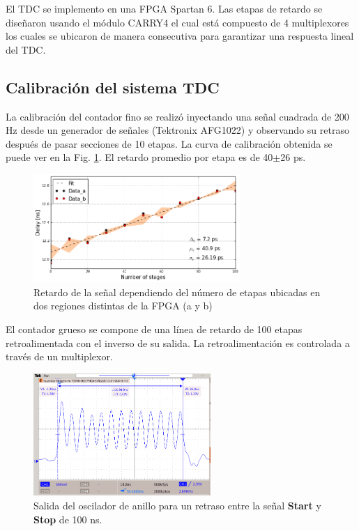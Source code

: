 El TDC se implemento en una FPGA Spartan 6. Las etapas de retardo se diseñaron usando el módulo CARRY4 el cual está compuesto de 4 multiplexores los cuales se ubicaron de manera consecutiva para garantizar una respuesta lineal del TDC.\\

\subsection{Calibración del sistema  TDC}

La calibración del contador fino se realizó inyectando una señal cuadrada de 200 Hz desde un generador de señales (Tektronix AFG1022) y observando su retraso después de pasar secciones de 10 etapas. La curva de calibración obtenida se puede ver en la Fig. \ref{loc}. El retardo promedio por etapa es de 40$\pm$26 ps.\\

\begin{figure}[h!]
\begin{center}
\includegraphics[width=0.7\textwidth]{Figures/ToF_delay}
\caption{Retardo de la señal dependiendo del número de etapas ubicadas en dos regiones distintas de la FPGA (a y b)}
\label{loc}
\end{center}
\end{figure}

El contador grueso se compone de una línea de retardo de 100 etapas retroalimentada con el inverso de su salida. La retroalimentación es controlada a través de un multiplexor.

\begin{figure}[h!]
\begin{center}
\includegraphics[width=0.6\textwidth]{Figures/Ringwaves}
\caption{Salida del oscilador de anillo para un retraso entre la señal \textbf{Start} y \textbf{Stop} de 100 ns.}
\label{waves}
\end{center}
\end{figure}

